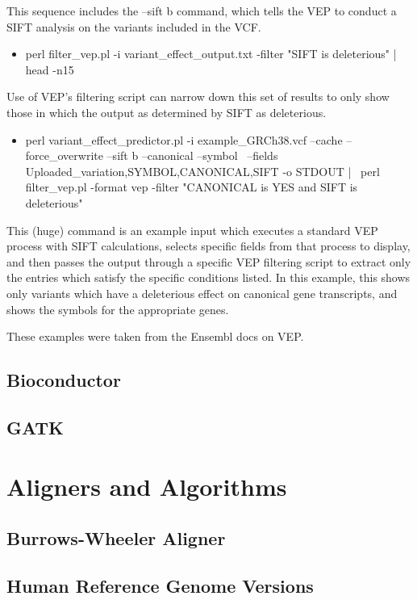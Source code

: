 \documentclass[12pt]{report}
\begin{document}
This sequence includes the --sift b command, which tells the VEP to conduct a SIFT analysis on the variants included in the VCF. 


\begin{itemize}
	\item perl filter\_vep.pl -i variant\_effect\_output.txt -filter "SIFT is deleterious" | head -n15
\end{itemize}

Use of VEP's filtering script can narrow down this set of results to only show those in which the output as determined by SIFT as deleterious.

\begin{itemize}
	\item perl variant\_effect\_predictor.pl -i example\_GRCh38.vcf --cache --force\_overwrite --sift b --canonical --symbol \
	--fields Uploaded\_variation,SYMBOL,CANONICAL,SIFT -o STDOUT | \
	perl filter\_vep.pl -format vep -filter "CANONICAL is YES and SIFT is deleterious"
\end{itemize}

This (huge) command is an example input which executes a standard VEP process with SIFT calculations, selects specific fields from that process to display, and then passes the output through a specific VEP filtering script to extract only the entries which satisfy the specific conditions listed. In this example, this shows only variants which have a deleterious effect on canonical gene transcripts, and shows the symbols for the appropriate genes.

These examples were taken from the Ensembl docs on VEP.

\section*{Bioconductor}

\section*{GATK}

\chapter*{Aligners and Algorithms}
\section*{Burrows-Wheeler Aligner}

\section*{Human Reference Genome Versions}
\end{document}
